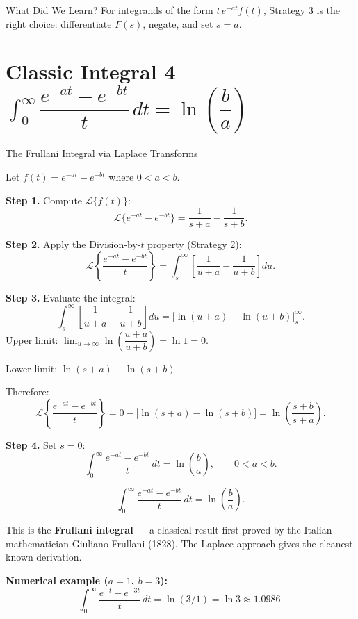 \documentclass[12pt,a4paper]{article}
\begin{document}
\begin{learnbox}{What Did We Learn?}
For integrands of the form $t\,e^{-at}f(t)$, Strategy 3 is the right choice:
differentiate $F(s)$, negate, and set $s = a$.
\end{learnbox}

\section{Classic Integral 4 --- $\int_0^\infty \dfrac{e^{-at}-e^{-bt}}{t}\, dt
         = \ln\!\left(\dfrac{b}{a}\right)$}

\begin{infobox}{The Frullani Integral via Laplace Transforms}

Let $f(t) = e^{-at} - e^{-bt}$ where $0 < a < b$.

\textbf{Step 1.} Compute $\mathcal{L}\{f(t)\}$:
\[
  \mathcal{L}\{e^{-at} - e^{-bt}\} = \frac{1}{s+a} - \frac{1}{s+b}.
\]

\textbf{Step 2.} Apply the Division-by-$t$ property (Strategy 2):
\[
  \mathcal{L}\!\left\{\frac{e^{-at}-e^{-bt}}{t}\right\}
  = \int_s^\infty \left[\frac{1}{u+a} - \frac{1}{u+b}\right] du.
\]

\textbf{Step 3.} Evaluate the integral:
\[
  \int_s^\infty \left[\frac{1}{u+a} - \frac{1}{u+b}\right] du
  = \Big[\ln(u+a) - \ln(u+b)\Big]_s^\infty.
\]
Upper limit: $\lim_{u\to\infty}\ln\!\left(\dfrac{u+a}{u+b}\right) = \ln 1 = 0$.

Lower limit: $\ln(s+a) - \ln(s+b)$.

Therefore:
\[
  \mathcal{L}\!\left\{\frac{e^{-at}-e^{-bt}}{t}\right\}
  = 0 - \bigl[\ln(s+a) - \ln(s+b)\bigr]
  = \ln\!\left(\frac{s+b}{s+a}\right).
\]

\textbf{Step 4.} Set $s = 0$:
\[
  \int_0^\infty \frac{e^{-at}-e^{-bt}}{t}\, dt
  = \ln\!\left(\frac{b}{a}\right), \qquad 0 < a < b.
\]

\[
  \boxed{\int_0^\infty \frac{e^{-at}-e^{-bt}}{t}\, dt = \ln\!\left(\frac{b}{a}\right).}
\]

This is the \textbf{Frullani integral} --- a classical result first proved by
the Italian mathematician Giuliano Frullani (1828). The Laplace approach gives
the cleanest known derivation.

\textbf{Numerical example ($a=1$, $b=3$):}
\[
  \int_0^\infty \frac{e^{-t}-e^{-3t}}{t}\, dt = \ln(3/1) = \ln 3 \approx 1.0986.
\]

\end{infobox}
\end{document}
